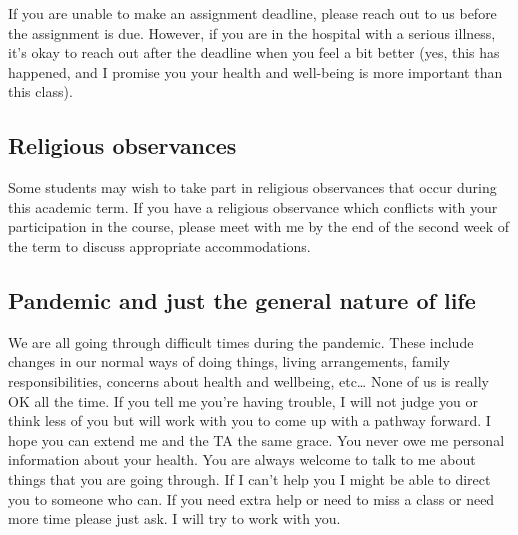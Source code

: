 \documentclass[
]{book}
\begin{document}
If you are unable to make an assignment deadline, please reach out to us before the assignment is due. However, if you are in the hospital with a serious illness, it's okay to reach out after the deadline when you feel a bit better (yes, this has happened, and I promise you your health and well-being is more important than this class).

\hypertarget{religious-observances}{%
\subsection{Religious observances}\label{religious-observances}}

Some students may wish to take part in religious observances that occur during this academic term. If you have a religious observance which conflicts with your participation in the course, please meet with me by the end of the second week of the term to discuss appropriate accommodations.

\hypertarget{pandemic-and-just-the-general-nature-of-life}{%
\subsection{Pandemic and just the general nature of life}\label{pandemic-and-just-the-general-nature-of-life}}

We are all going through difficult times during the pandemic. These include changes in our normal ways of doing things, living arrangements, family responsibilities, concerns about health and wellbeing, etc\ldots{} None of us is really OK all the time. If you tell me you're having trouble, I will not judge you or think less of you but will work with you to come up with a pathway forward. I hope you can extend me and the TA the same grace. You never owe me personal information about your health. You are always welcome to talk to me about things that you are going through. If I can't help you I might be able to direct you to someone who can. If you need extra help or need to miss a class or need more time please just ask. I will try to work with you.

  
\end{document}
